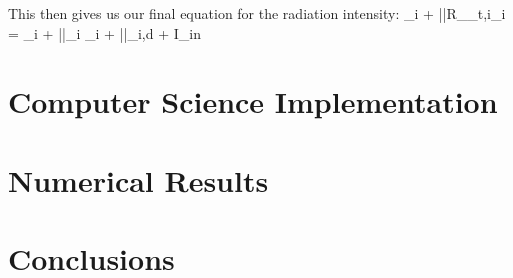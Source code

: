 This then gives us our final equation for the radiation intensity:
\benum
{} _i + \bar{\bar{\mathbf R}}_{\sigma_t,i}_i = \vec{\phi}_i + \bar{\bar{\mathbf \nu}}_i \vec{\phi}_i + \bar{\bar{\mathbf \xi}}_{i,d} + I_{in} 
\eenum

\section{Computer Science Implementation}
\label{sec:chap6_programming}

\section{Numerical Results}
\label{sec:chap6_results}

\section{Conclusions}
\label{sec:chap6_conclusions}



